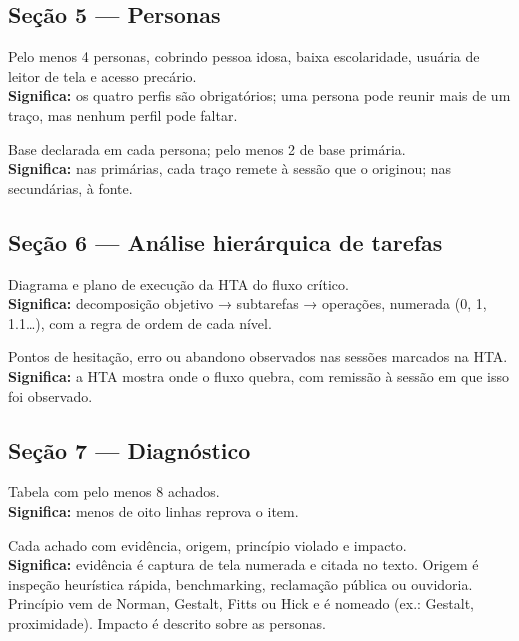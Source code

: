 \documentclass[11pt,a4paper]{article}
\newcommand{\obs}[1]{\\{\small\color{cinza}\textbf{Significa:} #1}}
\begin{document}
\subsection{Seção 5 --- Personas}
\begin{checks}
  \item Pelo menos 4 personas, cobrindo pessoa idosa, baixa escolaridade, usuária de leitor de tela e acesso precário.
    \obs{os quatro perfis são obrigatórios; uma persona pode reunir mais de um traço, mas nenhum perfil pode faltar.}
  \item Base declarada em cada persona; pelo menos 2 de base primária.
    \obs{nas primárias, cada traço remete à sessão que o originou; nas secundárias, à fonte.}
\end{checks}

\subsection{Seção 6 --- Análise hierárquica de tarefas}
\begin{checks}
  \item Diagrama e plano de execução da HTA do fluxo crítico.
    \obs{decomposição objetivo → subtarefas → operações, numerada (0, 1, 1.1…), com a regra de ordem de cada nível.}
  \item Pontos de hesitação, erro ou abandono observados nas sessões marcados na HTA.
    \obs{a HTA mostra onde o fluxo quebra, com remissão à sessão em que isso foi observado.}
\end{checks}

\subsection{Seção 7 --- Diagnóstico}
\begin{checks}
  \item Tabela com pelo menos 8 achados.
    \obs{menos de oito linhas reprova o item.}
  \item Cada achado com evidência, origem, princípio violado e impacto.
    \obs{evidência é captura de tela numerada e citada no texto. Origem é inspeção heurística rápida, benchmarking, reclamação pública ou ouvidoria. Princípio vem de Norman, Gestalt, Fitts ou Hick e é nomeado (ex.: Gestalt, proximidade). Impacto é descrito sobre as personas.}
\end{checks}
\end{document}
